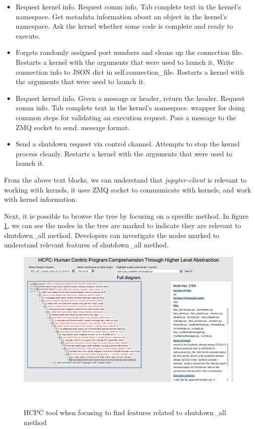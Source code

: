 \begin{itemize}
    \item Request kernel info. Request comm info. Tab complete text in the kernel's namespace. Get metadata information about an object in the kernel's namespace. Ask the kernel whether some code is complete and ready to execute.
    \item Forgets randomly assigned port numbers and cleans up the connection file. Restarts a kernel with the arguments that were used to launch it. Write connection info to JSON dict in self.connection\_file. Restarts a kernel with the arguments that were used to launch it.
    \item Request kernel info. Given a message or header, return the header. Request comm info. Tab complete text in the kernel's namespace. wrapper for doing common steps for validating an execution request. Pass a message to the ZMQ socket to send. message format.
    \item Send a shutdown request via control channel. Attempts to stop the kernel process cleanly. Restarts a kernel with the arguments that were used to launch it.
\end{itemize}

From the above text blocks, we can understand that \emph{jupyter-client} is relevant to working with kernels, it uses ZMQ socket to communicate with kernels, and work with kernel information. 

Next, it is possible to browse the tree by focusing on a specific method. In figure \ref{fig:tool_shutdown_all}, we can see the nodes in the tree are marked to indicate they are relevant to shutdown\_all method. Developers can investigate the nodes marked to understand relevant features of shutdown\_all method. 

\begin{figure}[h]
  \centering
  \includegraphics[width=\columnwidth]{figures/hla3/tool_shutdown_all.png}
  \caption{HCPC tool when focusing to find features related to shutdown\_all method }~\label{fig:tool_shutdown_all}
\end{figure}


